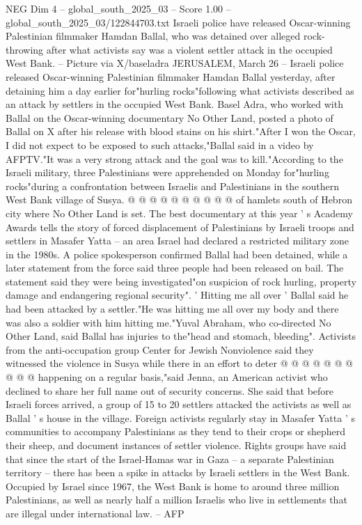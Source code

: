 \begin{textsample}{NEG Dim 4 – global\_south\_2025\_03 – Score 1.00 – global\_south\_2025\_03/122844703.txt}  \label{ex:f4_neg_424}
Israeli police have released Oscar-winning Palestinian filmmaker Hamdan Ballal, who was detained over alleged rock-throwing after what activists say was a violent settler attack in the occupied West Bank. -- Picture via X/baseladra JERUSALEM, March 26 -- Israeli police released Oscar-winning Palestinian filmmaker Hamdan Ballal yesterday, after detaining him a day earlier for"hurling rocks"following what activists described as an attack by settlers in the occupied West Bank.
Basel Adra, who worked with Ballal on the Oscar-winning documentary No Other Land, posted a photo of Ballal on X after his release with blood stains on his shirt."After I won the Oscar, I did not expect to be exposed to such attacks,"Ballal said in a video by AFPTV."It was a very strong attack and the goal was to kill."According to the Israeli military, three Palestinians were apprehended on Monday for"hurling rocks"during a confrontation between Israelis and Palestinians in the southern West Bank village of Susya. @ @ @ @ @ @ @ @ @ @ of hamlets south of Hebron city where No Other Land is set.
The best documentary at this year ' s Academy Awards tells the story of forced displacement of Palestinians by Israeli troops and settlers in Masafer Yatta -- an area Israel had declared a restricted military zone in the 1980s.
A police spokesperson confirmed Ballal had been detained, while a later statement from the force said three people had been released on bail.
The statement said they were being investigated"on suspicion of rock hurling, property damage and endangering regional security". ' Hitting me all over ' Ballal said he had been attacked by a settler."He was hitting me all over my body and there was also a soldier with him hitting me."Yuval Abraham, who co-directed No Other Land, said Ballal has injuries to the"head and stomach, bleeding".
Activists from the anti-occupation group Center for Jewish Nonviolence said they witnessed the violence in Susya while there in an effort to deter @ @ @ @ @ @ @ @ @ @ happening on a regular basis,"said Jenna, an American activist who declined to share her full name out of security concerns.
She said that before Israeli forces arrived, a group of 15 to 20 settlers attacked the activists as well as Ballal ' s house in the village.
Foreign activists regularly stay in Masafer Yatta ' s communities to accompany Palestinians as they tend to their crops or shepherd their sheep, and document instances of settler violence.
Rights groups have said that since the start of the Israel-Hamas war in Gaza -- a separate Palestinian territory -- there has been a spike in attacks by Israeli settlers in the West Bank.
Occupied by Israel since 1967, the West Bank is home to around three million Palestinians, as well as nearly half a million Israelis who live in settlements that are illegal under international law. -- AFP

\end{textsample}
